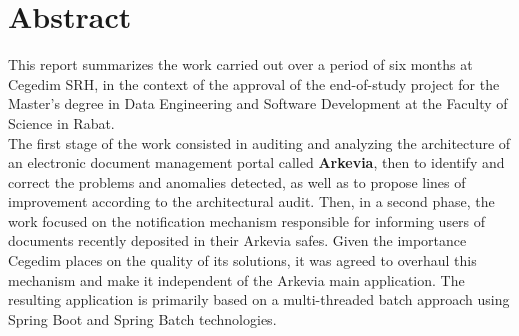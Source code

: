{}
\noindent \section*{Abstract}
This report summarizes the work carried out over a period of six months at Cegedim SRH, in the context of the approval of the end-of-study project for the Master's degree in Data Engineering and Software Development at the Faculty of Science in Rabat.\\
	
The first stage of the work consisted in auditing and analyzing the architecture of an electronic document management portal called \textbf{Arkevia}, then to identify and correct the problems and anomalies detected, as well as to propose lines of improvement according to the architectural audit. Then, in a second phase, the work focused on the notification mechanism responsible for informing users of documents recently deposited in their Arkevia safes. Given the importance Cegedim places on the quality of its solutions, it was agreed to overhaul this mechanism and make it independent of the Arkevia main application. The resulting application is primarily based on a multi-threaded batch approach using Spring Boot and Spring Batch technologies.
\newpage

